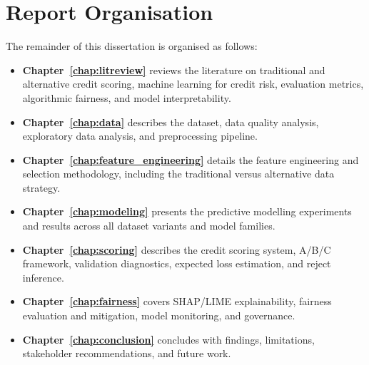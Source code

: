 \section{Report Organisation}
\label{sec:report_organisation}

The remainder of this dissertation is organised as follows:

\begin{itemize}
    \item \textbf{Chapter~\ref{chap:litreview}} reviews the literature on traditional and alternative credit scoring, machine learning for credit risk, evaluation metrics, algorithmic fairness, and model interpretability.
    \item \textbf{Chapter~\ref{chap:data}} describes the dataset, data quality analysis, exploratory data analysis, and preprocessing pipeline.
    \item \textbf{Chapter~\ref{chap:feature_engineering}} details the feature engineering and selection methodology, including the traditional versus alternative data strategy.
    \item \textbf{Chapter~\ref{chap:modeling}} presents the predictive modelling experiments and results across all dataset variants and model families.
    \item \textbf{Chapter~\ref{chap:scoring}} describes the credit scoring system, A/B/C framework, validation diagnostics, expected loss estimation, and reject inference.
    \item \textbf{Chapter~\ref{chap:fairness}} covers SHAP/LIME explainability, fairness evaluation and mitigation, model monitoring, and governance.
    \item \textbf{Chapter~\ref{chap:conclusion}} concludes with findings, limitations, stakeholder recommendations, and future work.
\end{itemize}
